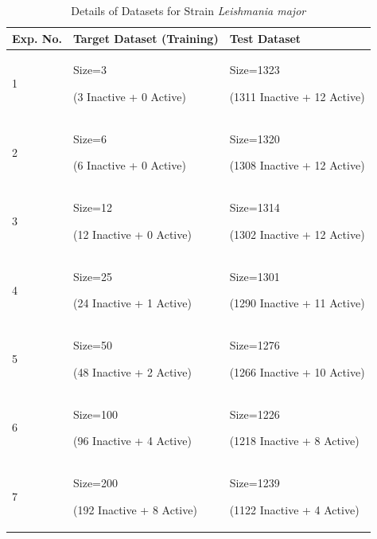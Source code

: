 \documentclass[a4paper,12pt, english]{article}
\begin{document}
\begin{itemize}
\begin{table}[h]
\centering
    \begin{tabular}{ | l | l | l | }
    \hline
      	\textbf{Exp. No.} & \textbf{Target Dataset (Training)} & \textbf{Test Dataset} \\ \hline
      	1 & Size=3   \begin{scriptsize}(3 Inactive + 0 Active)\end{scriptsize} & Size=1323 \begin{scriptsize}(1311 Inactive + 12 Active)\end{scriptsize}\\ \hline
	2 & Size=6   \begin{scriptsize}(6 Inactive + 0 Active)\end{scriptsize} & Size=1320 \begin{scriptsize}(1308 Inactive + 12 Active)\end{scriptsize}\\ \hline
	3 & Size=12  \begin{scriptsize}(12 Inactive + 0 Active)\end{scriptsize} & Size=1314 \begin{scriptsize}(1302 Inactive + 12 Active)\end{scriptsize}\\ \hline
	4 & Size=25  \begin{scriptsize}(24 Inactive + 1 Active)\end{scriptsize} & Size=1301 \begin{scriptsize}(1290 Inactive + 11 Active)\end{scriptsize}\\ \hline
	5 & Size=50  \begin{scriptsize}(48 Inactive + 2 Active)\end{scriptsize} & Size=1276 \begin{scriptsize}(1266 Inactive + 10 Active)\end{scriptsize}\\ \hline
	6 & Size=100 \begin{scriptsize}(96 Inactive + 4 Active)\end{scriptsize} & Size=1226 \begin{scriptsize}(1218 Inactive + 8 Active)\end{scriptsize}\\ \hline
	7 & Size=200 \begin{scriptsize}(192 Inactive + 8 Active)\end{scriptsize} & Size=1239 \begin{scriptsize}(1122 Inactive + 4 Active)\end{scriptsize}\\ \hline	
    \end{tabular}  
    \caption{Details of Datasets for Strain \emph{Leishmania major}}     
\end{table}

\end{itemize}  
\end{document}
